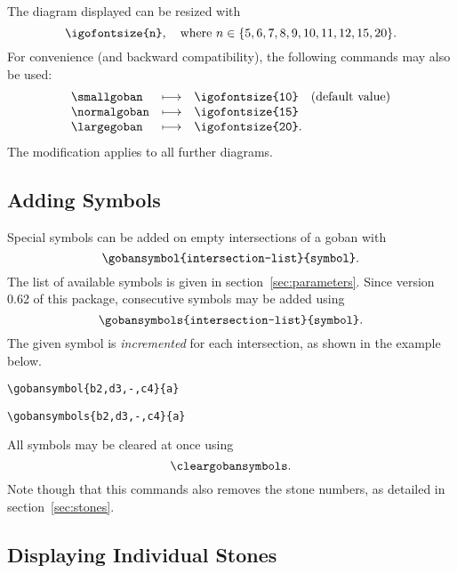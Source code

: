 \documentclass[fleqn]{article}
\begin{document}
The diagram displayed can be resized with \[\verb|\igofontsize{n}|, \quad\text{where $n \in \{5, 6, 7, 8, 9, 10, 11, 12, 15, 20\}$}.\] For convenience (and backward compatibility), the following commands may also be used: 
\[\begin{array}{lll}
	\verb|\smallgoban|  & \longmapsto & \verb|\igofontsize{10}| \quad\text{(default value)} \\
	\verb|\normalgoban| & \longmapsto & \verb|\igofontsize{15}| \\
	\verb|\largegoban|  & \longmapsto & \verb|\igofontsize{20}|.
\end{array}\]
The modification applies to all further diagrams.

\subsection{Adding Symbols}

Special symbols can be added on empty intersections of a goban with \[\verb|\gobansymbol{intersection-list}{symbol}|.\] The list of available symbols is given in section~\ref{sec:parameters}. Since version 0.62 of this package, consecutive symbols may be added using
\[\verb|\gobansymbols{intersection-list}{symbol}|.\] The given symbol is \emph{incremented} for each intersection, as shown in the example below.

\medskip
\begin{minipage}[c][1.0\height][c]{0.49\textwidth}
\begin{center}
	\cleargoban
	\showgoban\break
	\verb|\gobansymbol{b2,d3,-,c4}{a}|
\end{center}
\end{minipage}
\begin{minipage}[c][1.0\height][c]{0.49\textwidth}
\begin{center}
	\cleargoban
	\showgoban\break
	\verb|\gobansymbols{b2,d3,-,c4}{a}|
\end{center}
\end{minipage}
\medskip

All symbols may be cleared at once using \[\verb|\cleargobansymbols|.\] Note though that this commands also removes the stone numbers, as detailed in section~\ref{sec:stones}.

\subsection{Displaying Individual Stones}
\end{document}
